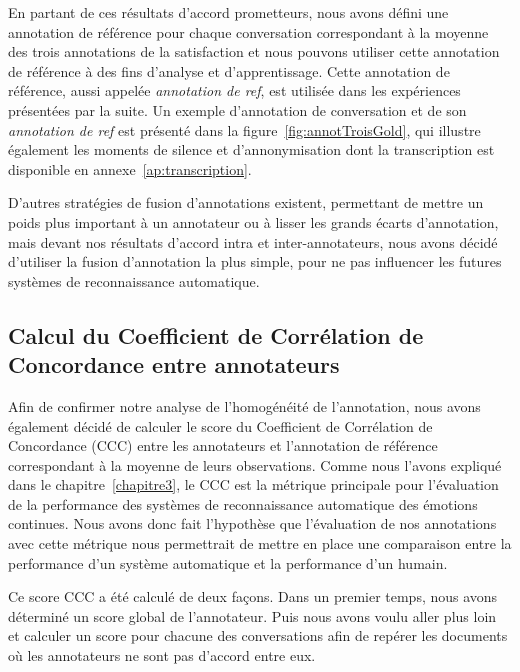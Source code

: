 
En partant de ces résultats d’accord prometteurs, nous avons défini une annotation de référence pour chaque conversation correspondant à la moyenne des trois annotations de la satisfaction et nous pouvons utiliser cette annotation de référence à des fins d’analyse et d’apprentissage. Cette annotation de référence, aussi appelée \textit{annotation de ref}, est utilisée dans les expériences présentées par la suite. Un exemple d'annotation de conversation et de son \textit{annotation de ref} est présenté dans la figure~\ref{fig:annotTroisGold}, qui illustre également les moments de silence et d'annonymisation dont la transcription est disponible en annexe~\ref{ap:transcription}.

D'autres stratégies de fusion d'annotations existent, permettant de mettre un poids plus important à un annotateur ou à lisser les grands écarts d'annotation, mais devant nos résultats d'accord intra et inter-annotateurs, nous avons décidé d'utiliser la fusion d'annotation la plus simple, pour ne pas influencer les futures systèmes de reconnaissance automatique.

\subsection{Calcul du Coefficient de Corrélation de Concordance entre annotateurs}
Afin de confirmer notre analyse de l'homogénéité de l'annotation, nous avons également décidé de calculer le score du  Coefficient de Corrélation de Concordance (CCC) entre les annotateurs et l'annotation de référence correspondant à la moyenne de leurs observations.
Comme nous l'avons expliqué dans le chapitre~\ref{chapitre3}, le CCC est la métrique principale pour l'évaluation de la performance des systèmes de reconnaissance automatique des émotions continues. Nous avons donc fait l'hypothèse que l'évaluation de nos annotations avec cette métrique nous permettrait de mettre en place une comparaison entre la performance d'un système automatique et la performance d'un humain.

Ce score CCC a été calculé de deux façons. Dans un premier temps, nous avons déterminé un score global de l'annotateur. Puis nous avons voulu aller plus loin et calculer un score pour chacune des conversations afin de repérer les documents où les annotateurs ne sont pas d'accord entre eux.



